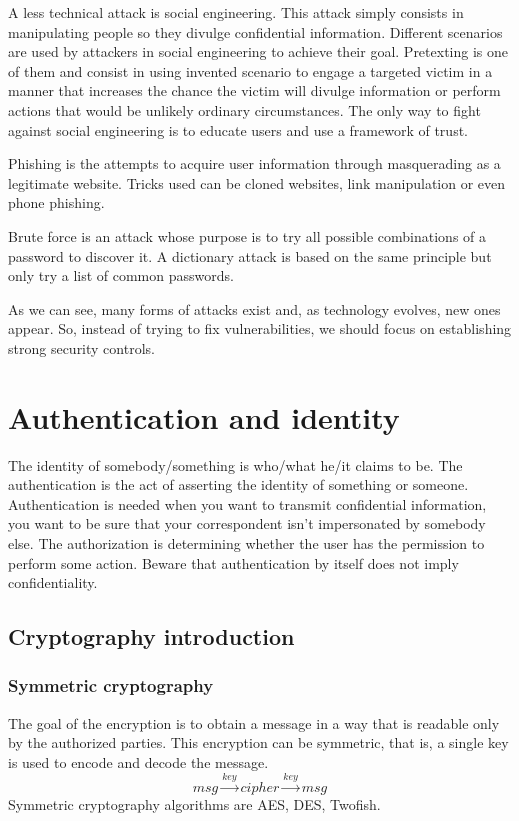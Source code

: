 A less technical attack is social engineering. This attack simply consists in
manipulating people so they divulge confidential information. Different
scenarios are used by attackers in social engineering to achieve their goal.
Pretexting is one of them and consist in using invented scenario to engage a
targeted victim in a manner that increases the chance the victim will divulge
information or perform actions that would be unlikely ordinary circumstances.
The only way to fight against social engineering is to educate users and use a
framework of trust.

Phishing is the attempts to acquire user information through masquerading as a
legitimate website. Tricks used can be cloned websites, link manipulation or
even phone phishing.

Brute force is an attack whose purpose is to try all possible combinations of
a password to discover it. A dictionary attack is based on the same principle
but only try a list of common passwords.

As we can see, many forms of attacks exist and, as technology evolves, new
ones appear. So, instead of trying to fix vulnerabilities, we should focus on
establishing strong security controls.

\section{Authentication and identity}

The identity of somebody/something is who/what he/it claims to be.
The authentication is the act of asserting the identity of something or someone.
Authentication is needed when you want to transmit confidential
information, you want to be sure that your correspondent isn't
impersonated by somebody else.
The authorization is determining whether the user has the permission to perform some action.
Beware that authentication by itself does not imply confidentiality.

\subsection{Cryptography introduction}

\subsubsection{Symmetric cryptography}
The goal of the encryption is to obtain a message in a way that is readable
only by the authorized parties.
This encryption can be symmetric, that is, a single key is used to encode and
decode the message.
\[ msg \xrightarrow{key} cipher \xrightarrow{key} msg \]
Symmetric cryptography algorithms are AES, DES, Twofish.

